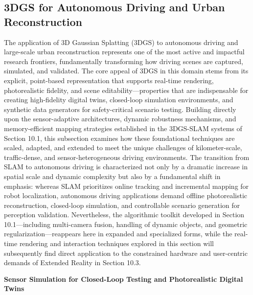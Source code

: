 \documentclass[11pt]{article}
\begin{document}
\subsection{3DGS for Autonomous Driving and Urban Reconstruction}

The application of 3D Gaussian Splatting (3DGS) to autonomous driving and large-scale urban reconstruction represents one of the most active and impactful research frontiers, fundamentally transforming how driving scenes are captured, simulated, and validated. The core appeal of 3DGS in this domain stems from its explicit, point-based representation that supports real-time rendering, photorealistic fidelity, and scene editability---properties that are indispensable for creating high-fidelity digital twins, closed-loop simulation environments, and synthetic data generators for safety-critical scenario testing. Building directly upon the sensor-adaptive architectures, dynamic robustness mechanisms, and memory-efficient mapping strategies established in the 3DGS-SLAM systems of Section 10.1, this subsection examines how these foundational techniques are scaled, adapted, and extended to meet the unique challenges of kilometer-scale, traffic-dense, and sensor-heterogeneous driving environments. The transition from SLAM to autonomous driving is characterized not only by a dramatic increase in spatial scale and dynamic complexity but also by a fundamental shift in emphasis: whereas SLAM prioritizes online tracking and incremental mapping for robot localization, autonomous driving applications demand offline photorealistic reconstruction, closed-loop simulation, and controllable scenario generation for perception validation. Nevertheless, the algorithmic toolkit developed in Section 10.1---including multi-camera fusion, handling of dynamic objects, and geometric regularization---reappears here in expanded and specialized forms, while the real-time rendering and interaction techniques explored in this section will subsequently find direct application to the constrained hardware and user-centric demands of Extended Reality in Section 10.3.

\textbf{Sensor Simulation for Closed-Loop Testing and Photorealistic Digital Twins}
\end{document}
